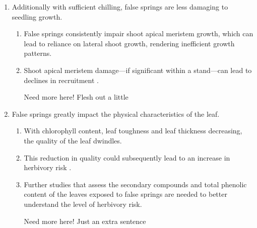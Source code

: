 \documentclass{article}\usepackage[]{graphicx}\usepackage[]{color}
\begin{document}
\begin{enumerate}
\item Additionally with sufficient chilling, false springs are less damaging to seedling growth.
  \begin{enumerate}
  \item False springs consistently impair shoot apical meristem growth, which can lead to reliance on lateral shoot growth, rendering inefficient growth patterns.
  \item Shoot apical meristem damage---if significant within a stand---can lead to declines in recruitment \citep{Rhodes2018}. 
  \item [Need more here! Flesh out a little] %
  \end{enumerate}
  
\item False springs greatly impact the physical characteristics of the leaf.
  \begin{enumerate}
  \item With chlorophyll content, leaf toughness and leaf thickness decreasing, the quality of the leaf dwindles.
  \item This reduction in quality could subsequently lead to an increase in herbivory risk \citep{Onda2011}.
  \item Further studies that assess the secondary compounds and total phenolic content \citep{Ayres1993, Webber2016} of the leaves exposed to false springs are needed to better understand the level of herbivory risk. 
  \item [Need more here! Just an extra sentence] %
  \end{enumerate}

  


\end{enumerate}
\end{document}
